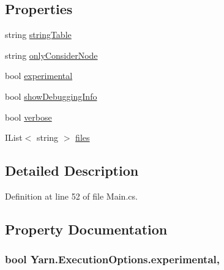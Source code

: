 \subsection*{Properties}
\begin{DoxyCompactItemize}
\item 
string \hyperlink{a00093_a7e43c3b73722956cb0f5d507e4eef527}{string\-Table}
\item 
string \hyperlink{a00093_af4c0062a1d46281d377f87084fde374e}{only\-Consider\-Node}
\item 
bool \hyperlink{a00093_ad97950e47ce2aaeb598295b7c3c44b13}{experimental}
\item 
bool \hyperlink{a00031_a89964ea17bd19caf00cb5bff563ed01c}{show\-Debugging\-Info}
\item 
bool \hyperlink{a00031_ada4d83d1756918f362d55f6649b82b17}{verbose}
\item 
I\-List$<$ string $>$ \hyperlink{a00031_aa93cbb1bc1d5328e0a417012621e92d2}{files}
\end{DoxyCompactItemize}


\subsection{Detailed Description}


Definition at line 52 of file Main.\-cs.



\subsection{Property Documentation}
\hypertarget{a00093_ad97950e47ce2aaeb598295b7c3c44b13}{
\subsubsection[{experimental}]{\setlength{\rightskip}{0pt plus 5cm}bool Yarn.\-Execution\-Options.\-experimental\hspace{0.3cm}{\ttfamily [get]}, {\ttfamily [set]}}}\label{a00093_ad97950e47ce2aaeb598295b7c3c44b13}


